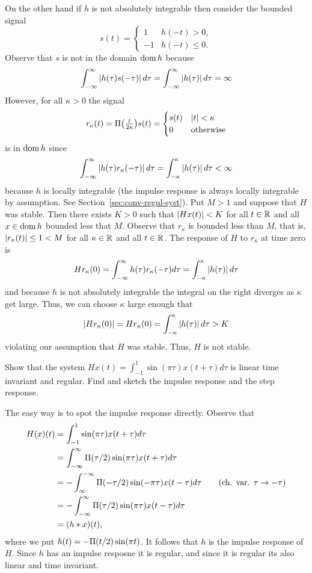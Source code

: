 \begin{excersizelist}
\begin{solution}
On the other hand if $h$ is not absolutely integrable then consider the bounded signal 
\[
s(t) = \begin{cases}
1 & h(-t) > 0,  \\
-1 & h(-t) \leq 0.
\end{cases}
\]
Observe that $s$ is not in the domain $\operatorname{dom} h$ because
\[
\int_{-\infty}^\infty \left\vert h(\tau)  s(-\tau) \right\vert d\tau = \int_{-\infty}^\infty \left\vert h(\tau) \right\vert d\tau = \infty
\]
However, for all $\kappa > 0$ the signal 
\[
r_\kappa(t) = \Pi\big(\tfrac{t}{2\kappa}\big) s(t) = 
\begin{cases}
s(t) & \left\vert t \right\vert < \kappa \\
0 & \text{otherwise}
\end{cases}
\]
is in $\operatorname{dom} h$ since
\[
\int_{-\infty}^\infty \left\vert h(\tau)  r_\kappa(-\tau) \right\vert d\tau = \int_{-\kappa}^\kappa \left\vert h(\tau) \right\vert d\tau < \infty
\]
because $h$ is locally integrable (the impulse response is always locally integrable by assumption.  See Section~\ref{sec:conv-regul-syst}).  Put $M > 1$ and suppose that $H$ was stable.  Then there exists $K > 0$ such that $\left\vert H x(t) \right\vert < K$ for all $t \in {\mathbb R}$ and all $x \in \operatorname{dom} h$ bounded less that $M$.  Observe that $r_\kappa$ is bounded less than $M$, that is, $\left\vert r_\kappa(t) \right\vert \leq 1 < M$ for all $\kappa \in {\mathbb R}$ and all $t \in {\mathbb R}$.  The response of $H$ to $r_\kappa$ at time zero is
\[
H r_\kappa(0) = \int_{-\infty}^\infty h(\tau)  r_\kappa(-\tau) d\tau =  \int_{-\kappa}^\kappa \left\vert h(\tau) \right\vert d\tau
\]
and because $h$ is not absolutely integrable the integral on the right diverges as $\kappa$ get large.  Thus, we can choose $\kappa$ large enough that
\[
\left\vert H r_\kappa(0) \right\vert = H r_\kappa(0) = \int_{-\kappa}^\kappa \left\vert h(\tau) \right\vert d\tau > K
\]
violating our assumption that $H$ was stable.  Thus, $H$ is not stable.
\end{solution}

\item Show that the system $Hx(t) = \int_{-1}^{1} \sin(\pi\tau) x(t + \tau) d\tau$ is linear time invariant and regular.  Find and sketch the impulse response and the step response.
\begin{solution}
The easy way is to spot the impulse response directly.  Observe that
\begin{align*}
H(x)(t) &= \int_{-1}^{1} \sin(\pi\tau) x(t + \tau) d\tau \\
&= \int_{-\infty}^\infty \Pi(\tau/2) \sin(\pi\tau) x(t + \tau) d\tau\\
&= -\int_{\infty}^{-\infty} \Pi(-\tau/2) \sin(-\pi\tau) x(t - \tau) d\tau \qquad \text{(ch. var. $\tau \to -\tau$)} \\
&= -\int_{-\infty}^{\infty} \Pi(\tau/2) \sin(\pi\tau) x(t - \tau) d\tau \\
&= (h * x)(t),
\end{align*}
where we put $h(t) = -\Pi(t/2) \sin(\pi t)$.  It follows that $h$ is the impulse response of $H$.  Since $h$ has an impulse resposne it is regular, and since it is regular its also linear and time invariant.


\end{solution}
\end{excersizelist}
